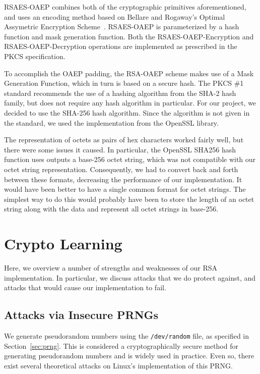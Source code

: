 \documentclass[letterpaper]{article}
\begin{document}
RSAES-OAEP combines both of the cryptographic primitives aforementioned, and uses an encoding method based on Bellare and Rogaway's Optimal Assymetric Encryption Scheme~\cite{bellare1994optimal}. RSAES-OAEP is parameterized by a hash function and mask generation function. Both the RSAES-OAEP-Encryption and RSAES-OAEP-Decryption operations are implemented as prescribed in the PKCS specification.

To accomplish the OAEP padding, the RSA-OAEP scheme makes use of a Mask Generation Function, which in turn is based on a secure hash. The PKCS \#1 standard recommends the use of a hashing algorithm from the SHA-2 hash family, but does not require any hash algorithm in particular. For our project, we decided to use the SHA-256 hash algorithm. Since the algorithm is not given in the standard, we used the implementation from the OpenSSL library.

The representation of octets as pairs of hex characters worked fairly well, but there were some issues it caused. In particular, the OpenSSL SHA256 hash function uses outputs a base-256 octet string, which was not compatible with our octet string representation. Consequently, we had to convert back and forth between these formats, decreasing the performance of our implementation. It would have been better to have a single common format for octet strings. The simplest way to do this would probably have been to store the length of an octet string along with the data and represent all octet strings in base-256.


\section{Crypto Learning}

Here, we overview a number of strengths and weaknesses of our RSA implementation. In particular, we discuss attacks that we do protect against, and attacks that would cause our implementation to fail.

\subsection{Attacks via Insecure PRNGs}

We generate pseudorandom numbers using the {\tt /dev/random} file, as specified in Section~\ref{sec:prng}. This is considered a cryptographically secure method for generating pseudorandom numbers and is widely used in practice. Even so, there exist several theoretical attacks on Linux's implementation of this PRNG.
\end{document}
